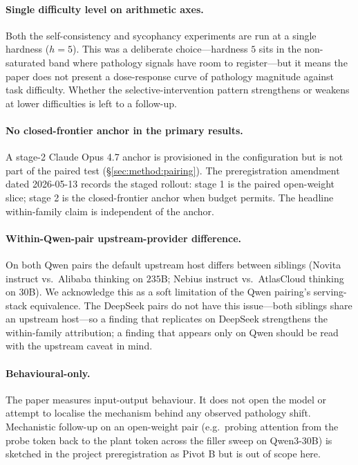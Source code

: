 \paragraph{Single difficulty level on arithmetic axes.}
Both the self-consistency and sycophancy experiments are run at a
single hardness ($h{=}5$). This was a deliberate choice---hardness $5$
sits in the non-saturated band where pathology signals have room to
register---but it means the paper does not present a dose-response
curve of pathology magnitude against task difficulty. Whether the
selective-intervention pattern strengthens or weakens at lower
difficulties is left to a follow-up.

\paragraph{No closed-frontier anchor in the primary results.}
A stage-2 Claude Opus 4.7 anchor is provisioned in the configuration
but is not part of the paired test
(\S\ref{sec:method:pairing}). The preregistration amendment dated
2026-05-13 records the staged rollout: stage 1 is the paired
open-weight slice; stage 2 is the closed-frontier anchor when budget
permits. The headline within-family claim is independent of the anchor.

\paragraph{Within-Qwen-pair upstream-provider difference.}
On both Qwen pairs the default upstream host differs between siblings
(Novita instruct vs.\ Alibaba thinking on $235$B; Nebius instruct vs.\
AtlasCloud thinking on $30$B). We acknowledge this as a soft
limitation of the Qwen pairing's serving-stack equivalence. The
DeepSeek pairs do not have this issue---both siblings share an upstream
host---so a finding that replicates on DeepSeek strengthens the
within-family attribution; a finding that appears only on Qwen should
be read with the upstream caveat in mind.

\paragraph{Behavioural-only.}
The paper measures input-output behaviour. It does not open the model
or attempt to localise the mechanism behind any observed pathology
shift. Mechanistic follow-up on an open-weight pair (e.g.\ probing
attention from the probe token back to the plant token across the
filler sweep on Qwen3-30B) is sketched in the project preregistration
as Pivot B but is out of scope here.

